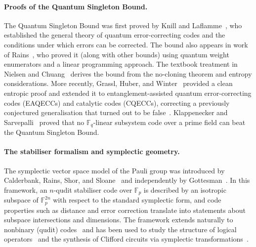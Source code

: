\documentclass[11pt]{article}
\theoremstyle{plain}
\theoremstyle{definition}
\newcommand{\F}{\mathbb{F}}
\begin{document}
\paragraph{Proofs of the Quantum Singleton Bound.}
The Quantum Singleton Bound was first proved by Knill and
Laflamme~\cite{KnillLaflamme1997}, who established the general theory of quantum
error-correcting codes and the conditions under which errors can be corrected.  The bound also
appears in work of Rains~\cite{Rains1999}, who proved it (along with other bounds) using
quantum weight enumerators and a linear programming approach.  The textbook treatment in
Nielsen and Chuang~\cite{NielsenChuang} derives the bound from the no-cloning theorem and
entropy considerations.  More recently, Grassl, Huber, and
Winter~\cite{GrasslHuberWinter2022} provided a clean entropic proof and extended it to
entanglement-assisted quantum error-correcting codes (EAQECCs) and catalytic codes (CQECCs),
correcting a previously conjectured generalisation that turned out to be
false~\cite{GrasslCounterexample2021}.  Klappenecker and
Sarvepalli~\cite{KlappeneckerSarvepalli2008} proved that no $\F_q$-linear subsystem code over
a prime field can beat the Quantum Singleton Bound.

\paragraph{The stabiliser formalism and symplectic geometry.}
The symplectic vector space model of the Pauli group was introduced by Calderbank, Rains,
Shor, and Sloane~\cite{CalderbankRainsShorSloane1997,CalderbankRainsShorSloane1998} and
independently by Gottesman~\cite{Gottesman1997}.  In this framework, an $n$-qudit stabiliser
code over $\F_p$ is described by an isotropic subspace of $\F_p^{2n}$ with respect to the
standard symplectic form, and code properties such as distance and error correction translate
into statements about subspace intersections and dimensions.  The framework extends naturally
to nonbinary (qudit) codes~\cite{Ashikhmin2001,KetkarKlappeneckerKumarSarvepalli2006} and
has been used to study the structure of logical operators~\cite{Wilde2009} and the synthesis
of Clifford circuits via symplectic transformations~\cite{Rengaswamy2018}.
\end{document}
